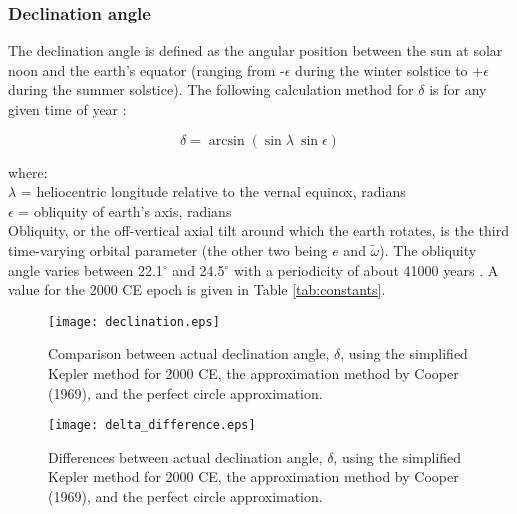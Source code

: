 \subsubsection{Declination angle}
\label{sec:delta}
The declination angle is defined as the angular position between the sun at solar noon and the earth's equator (ranging from -$\epsilon$ during the winter solstice to +$\epsilon$ during the summer solstice). 
The following calculation method for $\delta$ is for any given time of year \parencite{woolf68, loutre03}:

\begin{equation}
\label{eq:delta}
    \delta = \arcsin\left(\sin\lambda\:\sin\epsilon\right)
\end{equation}

\noindent where: \\
\indent $\lambda$ = heliocentric longitude relative to the vernal equinox, radians\\
\indent $\epsilon$ = obliquity of earth's axis, radians\\

Obliquity, or the off-vertical axial tilt around which the earth rotates, is the third time-varying orbital parameter (the other two being $e$ and $\tilde{\omega}$).  
The obliquity angle varies between 22.1$^{\circ}$ and 24.5$^{\circ}$ with a periodicity of about 41000 years \parencite{hays76,berger77}. 
A value for the 2000 CE epoch is given in Table \ref{tab:constants}.


\begin{figure}[ht!]
    \texttt{[image: declination.eps]}
    \caption{Comparison between actual declination angle, $\delta$, using the simplified Kepler method for 2000 CE, the approximation method by Cooper (1969), and the perfect circle approximation.}
    \label{fig:delta}
\end{figure}

\begin{figure}[ht!]
    \texttt{[image: delta\_difference.eps]}
    \caption{Differences between actual declination angle, $\delta$, using the simplified Kepler method for 2000 CE, the approximation method by Cooper (1969), and the perfect circle approximation.}
    \label{fig:ddiff}
\end{figure}

